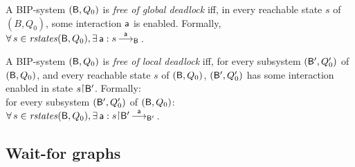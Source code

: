 

\begin{definition}
\label{def:static:deadlock-free}
\label{def:global.deadlock-free} 
\label{defn:static:deadlock-free}
\label{defn:global.deadlock-free} 
A BIP-system $(\mathsf{B}, Q_0)$ is \emph{free of global deadlock} iff,
in every reachable state $s$ of $(B, Q_0)$, some interaction $\mathsf{a}$ is enabled.
Formally, $\forall\, s \in \mathit{rstates}(\mathsf{B},Q_0), \exists\, \mathsf{a} : s \mbox{$\, \stackrel{\mathsf{a}}{\longrightarrow}_{\mathsf{B}} \,$}$.
\end{definition}


\begin{definition}
\label{def:local.deadlock-free} 
\label{defn:local.deadlock-free} 
A BIP-system $(\mathsf{B}, Q_0)$ is \emph{free of local deadlock} iff, 
for every subsystem $(\mathsf{B}', Q'_0)$ of  $(\mathsf{B}, Q_0)$, and every reachable state $s$ of $(\mathsf{B}, Q_0)$,
$(\mathsf{B}', Q'_0)$ has some interaction enabled in state $s \pj \B'$.
Formally:\\
\ind for every subsystem $(\mathsf{B}', Q'_0)$ of  $(\mathsf{B}, Q_0)$:\\
\ind \ind $\fa s \in \rstates{\B,Q_0},  \ex \act : s \pj \B' \enb{\act}{\B'}$.
\end{definition}



\subsection{Wait-for graphs}
\label{secn:wait-for-graphs}

